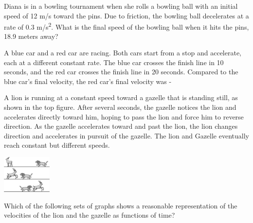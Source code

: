 \documentclass[10pt]{examdesign}
\begin{document}
\begin{multiplechoice} [title={Multiple Choice},
	rearrange=yes]
\begin{question}
Diana is in a bowling tournament when she rolls a bowling ball with an initial speed of 12 m/s toward the pins.  Due to friction, the bowling ball decelerates at a rate of 0.3 m/s\textsuperscript{2}.  What is the final speed of the bowling ball when it hits the pins, 18.9 meters away?

\end{question}


\begin{question}
A blue car and a red car are racing.  Both cars start from a stop and accelerate, each at a different constant rate.  The blue car crosses the finish line in 10 seconds, and the red car crosses the finish line in 20 seconds.  Compared to the blue car's final velocity, the red car's final velocity was - 
	\end{question}

\begin{question}
	
A lion is running at a constant speed toward a gazelle that is standing still, as shown in the top figure.  After several seconds, the gazelle notices the lion and accelerates directly toward him, hoping to pass the lion and force him to reverse direction.  As the gazelle accelerates toward and past the lion, the lion changes direction and accelerates in pursuit of the gazelle.   The lion and Gazelle eventually reach constant but different speeds. 

\begin{center} \includegraphics[height=0.75in]{lg1.png} \end{center}


 Which of the following sets of graphs shows a reasonable representation of the velocities of the lion and the gazelle as functions of time? 
 

\end{question}
\end{multiplechoice}
\end{document}
